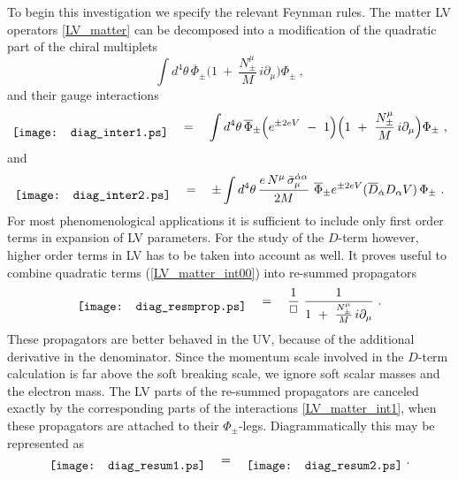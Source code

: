 \documentclass[12pt]{revtex4}
\begin{document}
To begin this investigation we specify the relevant Feynman rules. 
The matter LV operators \eqref{LV_matter} can be decomposed into
a modification of the quadratic part of the chiral multiplets 
%
\begin{equation} 
\int d^4\theta\, 
\overline{\Phi}_\pm 
\Big( 1 ~+~ \frac{N_\pm^\mu}{M} \, i \partial_\mu  \Big) 
\Phi_\pm~, 
\label{LV_matter_int00}
\end{equation}
%
and their gauge interactions
%
\begin{equation} 
\raisebox{-1ex}{\texttt{[image: diag\_inter1.ps]}}
\quad = \quad 
\int d^4\theta\, 
\overline{\Phi}_\pm 
\Big(  e^{\pm 2 e V} ~-~ 1 \Big) 
\Big( 1 ~+~ \frac{N_\pm^\mu}{M} \, i \partial_\mu  \Big) 
\Phi_\pm~, 
\label{LV_matter_int1}
\end{equation}
%
and 
%
\begin{equation}
\raisebox{-1ex}{\texttt{[image: diag\_inter2.ps]}}
\quad = \quad 
\pm \int d^4\theta\, 
\frac {e \, N^\mu \, \bar\sigma_\mu^{\dot\alpha\alpha}}{2M} ~ 
\overline{\Phi}_\pm 
e^{\pm 2eV} 
( \overline{D}_{\dot\alpha} D_\alpha V) \, 
\Phi_\pm~. 
\label{LV_matter_int2}
\end{equation} 
%
For most  phenomenological applications it is sufficient to include
only first order terms in expansion of LV parameters. For 
the study of the $D$-term however, higher order terms in LV has to be
taken into account as well. It proves useful to combine quadratic
terms (\ref{LV_matter_int00}) into re-summed  propagators 
%
\begin{equation} 
\raisebox{-1ex}{\texttt{[image: diag\_resmprop.ps]}}
\quad = \quad 
\frac 1{\Box}~  \frac 1{1 ~+~  \frac{ N_\pm^\mu} M \, i\partial_\mu}~. 
\end{equation} 
%
These propagators are better behaved in the UV, because of the additional 
derivative in the denominator. Since the momentum scale involved in
the $D$-term calculation is far above the soft breaking scale, we
ignore soft scalar masses and the electron mass. The LV parts of the
re-summed propagators are canceled exactly by the corresponding parts of
the interactions \eqref{LV_matter_int1}, when these propagators are
attached to their $\Phi_\pm$-legs. Diagrammatically this may be 
represented as  
%
\begin{equation}
\raisebox{-1ex}{\texttt{[image: diag\_resum1.ps]}}
\quad = \quad 
\raisebox{-1ex}{\texttt{[image: diag\_resum2.ps]}}
~. 
\label{ResummedPropVer}
\end{equation}
\end{document}
